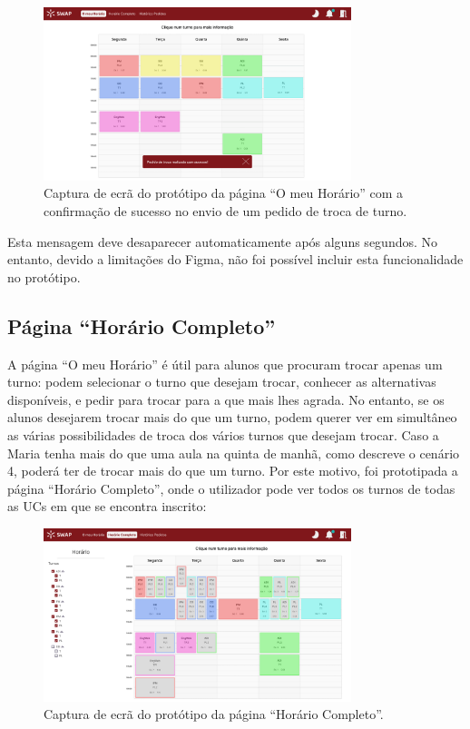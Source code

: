 \documentclass[12pt, a4paper]{article}
\begin{document}
\begin{figure}[H]
    \centering
    \includegraphics[width=0.8\textwidth]{res/prototype/o-meu-horario-toast-sucesso-troca.png}
    \caption{
        \onehalfspacing
        Captura de ecrã do protótipo da página ``O meu Horário'' com a confirmação de sucesso no
        envio de um pedido de troca de turno.
    }
    \label{o-meu-horario-toast-sucesso-troca}
\end{figure}

Esta mensagem deve desaparecer automaticamente após alguns segundos. No entanto, devido a limitações
do Figma, não foi possível incluir esta funcionalidade no protótipo.

\subsection{Página ``Horário Completo''}

A página ``O meu Horário'' é útil para alunos que procuram trocar apenas um turno: podem selecionar
o turno que desejam trocar, conhecer as alternativas disponíveis, e pedir para trocar para a que
mais lhes agrada. No entanto, se os alunos desejarem trocar mais do que um turno, podem querer ver
em simultâneo as várias possibilidades de troca dos vários turnos que desejam trocar. Caso a Maria
tenha mais do que uma aula na quinta de manhã, como descreve o cenário 4, poderá ter de trocar mais
do que um turno. Por este motivo, foi prototipada a página ``Horário Completo'', onde o utilizador
pode ver todos os turnos de todas as UCs em que se encontra inscrito:

\begin{figure}[H]
    \centering
    \includegraphics[width=0.8\textwidth]{res/prototype/horario-completo.png}
    \caption{Captura de ecrã do protótipo da página ``Horário Completo''.}
    \label{horario-completo}
\end{figure}
\end{document}
